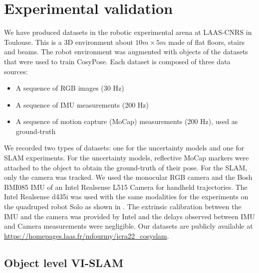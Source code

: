 \section{Experimental validation}

We have produced datasets in the robotic experimental arena at LAAS-CNRS in Toulouse. This is a 3D environment about $10 m \times 5m$ made of flat floors, 
stairs and beams. The robot environment was augmented with objects of the datasets that were used to train CosyPose. Each dataset is composed of three data sources:

\begin{itemize}
    \item A sequence of RGB images (30 Hz)
    \item A sequence of IMU measurements (200 Hz)
    \item A sequence of motion capture (MoCap) measurements (200 Hz), used as ground-truth 
\end{itemize}

We recorded two types of datasets: one for the uncertainty models and one for SLAM experiments. For the uncertainty models, reflective MoCap markers 
were attached to the object to obtain the ground-truth of their pose. For the SLAM, only the camera was tracked. We used the monocular RGB camera and the Bosh BMI085 
IMU of an Intel Realsense L515 Camera for handheld trajectories. The Intel Realsense d435i was used with the same modalities 
for the experiments on the quadruped robot Solo \cite{grimminger2020open} as shown in . 
The extrinsic calibration between the IMU and the camera was provided by Intel and the delays observed between IMU and Camera measurements were negligible. 
Our datasets are publicly available at \url{https://homepages.laas.fr/mfourmy/icra22_cosyslam}.





\subsection{Object level VI-SLAM}

